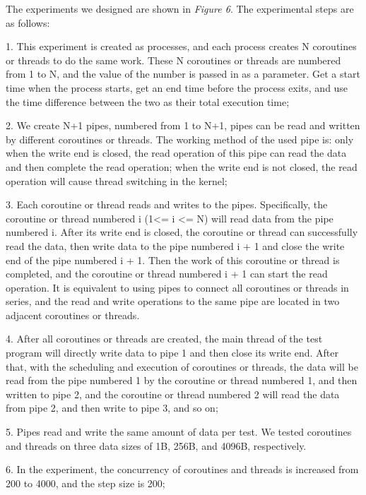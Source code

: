 \documentclass[10pt]{article}
\begin{document}
The experiments we designed are shown in \textit{Figure 6}. The experimental steps are as follows:

1. This experiment is created as processes, and each process creates N coroutines or threads to do the same work. These N coroutines or threads are numbered from 1 to N, and the value of the number is passed in as a parameter. Get a start time when the process starts, get an end time before the process exits, and use the time difference between the two as their total execution time;

2. We create N+1 pipes, numbered from 1 to N+1, pipes can be read and written by different coroutines or threads. The working method of the used pipe is: only when the write end is closed, the read operation of this pipe can read the data and then complete the read operation; when the write end is not closed, the read operation will cause thread switching in the kernel;

3. Each coroutine or thread reads and writes to the pipes. Specifically, the coroutine or thread numbered i (1<= i <= N) will read data from the pipe numbered i. After its write end is closed, the coroutine or thread can successfully read the data, then write data to the pipe numbered i + 1 and close the write end of the pipe numbered i + 1. Then the work of this coroutine or thread is completed, and the coroutine or thread numbered i + 1 can start the read operation. It is equivalent to using pipes to connect all coroutines or threads in series, and the read and write operations to the same pipe are located in two adjacent coroutines or threads.

4. After all coroutines or threads are created, the main thread of the test program will directly write data to pipe 1 and then close its write end. After that, with the scheduling and execution of coroutines or threads, the data will be read from the pipe numbered 1 by the coroutine or thread numbered 1, and then written to pipe 2, and the coroutine or thread numbered 2 will read the data from pipe 2, and then write to pipe 3, and so on;

5. Pipes read and write the same amount of data per test. We tested coroutines and threads on three data sizes of 1B, 256B, and 4096B, respectively.

6. In the experiment, the concurrency of coroutines and threads is increased from 200 to 4000, and the step size is 200;
\end{document}

